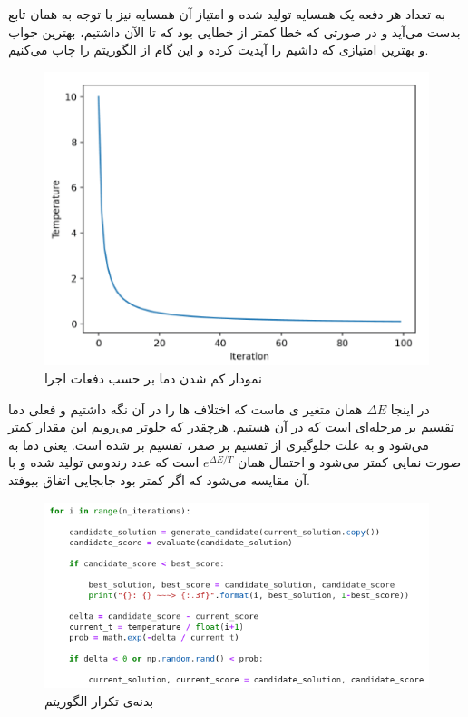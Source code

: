 \documentclass{article}
\begin{document}
\begin{multicols}{2}
به تعداد
هر دفعه یک همسایه تولید شده و امتیاز آن همسایه نیز با توجه به همان تابع
بدست می‌آید و در صورتی که خطا کمتر از خطایی بود که تا الآن داشتیم، بهترین جواب و بهترین امتیازی که داشیم را آپدیت کرده و این گام از الگوریتم را چاپ می‌کنیم.
\begin{figure}[H]
    \centering
    \includegraphics[width=0.99\linewidth]{Photos/SA/temperature.png}
    \caption{
    نمودار کم شدن دما بر حسب دفعات اجرا
    }
    \label{fig:my_label}
\end{figure}

در اینجا
$\Delta E$
همان متغیر
ی ماست که اختلاف
ها را در آن نگه داشتیم و 
فعلی دما تقسیم بر مرحله‌ای است که در آن هستیم. هرچقدر که جلوتر می‌رویم این مقدار کمتر می‌شود و به علت جلوگیری از تقسیم بر صفر، تقسیم بر
شده است. یعنی دما به صورت نمایی کمتر می‌شود و احتمال همان
$e^{\Delta E/T}$
است که عدد رندومی تولید شده و با آن مقایسه می‌شود که اگر کمتر بود جابجایی اتفاق بیوفتد.
\begin{figure}[H]
    \centering
    \includegraphics[width=0.99\linewidth]{Photos/SA/algorithm.png}
    \caption{
    بدنه‌ی تکرار الگوریتم
    }
    \label{fig:my_label}
\end{figure}


\end{multicols}
\end{document}
